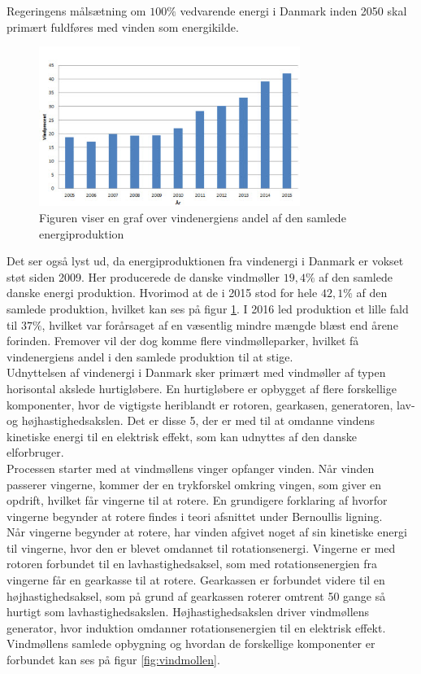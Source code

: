 
\usepackage{wrapfig}

Regeringens målsætning om $100 \%$ vedvarende energi i Danmark inden 2050 skal primært fuldføres med vinden som energikilde. 

\begin{figure}
\includegraphics[width=8.5cm]{billeder/vindgraf}
\caption{Figuren viser en graf over vindenergiens andel af den samlede energiproduktion \citep{2}}
\label{fig:vindgraf}
\end{figure} 

Det ser også lyst ud, da energiproduktionen fra vindenergi i Danmark er vokset støt siden 2009. Her producerede de danske vindmøller $19,4 \%$ af den samlede danske energi produktion. Hvorimod at de i 2015 stod for hele $42,1 \%$ af den samlede produktion, hvilket kan ses på figur \ref{fig:vindgraf}. I 2016 led produktion et lille fald til $37 \%$, hvilket var forårsaget af en væsentlig mindre mængde blæst end årene forinden. Fremover vil der dog komme flere vindmølleparker, hvilket få vindenergiens andel i den samlede produktion til at stige. \\
Udnyttelsen af vindenergi i Danmark sker primært med vindmøller af typen horisontal akslede hurtigløbere.
En hurtigløbere er opbygget af flere forskellige komponenter, hvor de vigtigste heriblandt er rotoren, gearkasen, generatoren, lav- og højhastighedsakslen. Det er disse 5, der er med til at omdanne vindens kinetiske energi til en elektrisk effekt, som kan udnyttes af den danske elforbruger. \\
Processen starter med at vindmøllens vinger opfanger vinden. Når vinden passerer vingerne, kommer der en trykforskel omkring vingen, som giver en opdrift, hvilket får vingerne til at rotere. En grundigere forklaring af hvorfor vingerne begynder at rotere findes i teori afsnittet under Bernoullis ligning. \\
Når vingerne begynder at rotere, har vinden afgivet noget af sin kinetiske energi til vingerne, hvor den er blevet omdannet til rotationsenergi. Vingerne er med rotoren forbundet til en lavhastighedsaksel, som med rotationsenergien fra vingerne får en gearkasse til at rotere. Gearkassen er forbundet videre til en højhastighedsaksel, som på grund af gearkassen roterer omtrent 50 gange så hurtigt som lavhastighedsakslen. Højhastighedsakslen driver vindmøllens generator, hvor induktion omdanner rotationsenergien til en elektrisk effekt. Vindmøllens samlede opbygning og hvordan de forskellige komponenter er forbundet kan ses på figur \ref{fig:vindmollen}.

